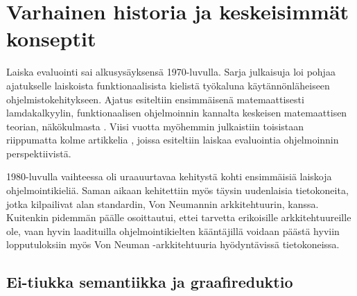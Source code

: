 
\section{Varhainen historia ja keskeisimmät konseptit}\label{historia}

Laiska evaluointi sai alkusysäyksensä 1970-luvulla. Sarja julkaisuja loi pohjaa ajatukselle laiskoista funktionaalisista kielistä työkaluna käytännönläheiseen ohjelmistokehitykseen. Ajatus esiteltiin ensimmäisenä matemaattisesti lamdakalkyylin, funktionaalisen ohjelmoinnin kannalta keskeisen matemaattisen teorian, näkökulmasta \citep{wadsworth1971semantics}. Viisi vuotta myöhemmin julkaistiin toisistaan riippumatta kolme artikkelia \citep{henderson1976lazy,friedman1976cuns,saslmanualturner}, joissa esiteltiin laiskaa evaluointia ohjelmoinnin perspektiivistä.

1980-luvulla vaihteessa oli uraauurtavaa kehitystä kohti ensimmäisiä laiskoja ohjelmointikieliä. Saman aikaan kehitettiin myös täysin uudenlaisia tietokoneita, jotka kilpailivat alan standardin, Von Neumannin arkkitehtuurin, kanssa. Kuitenkin pidemmän päälle osoittautui, ettei tarvetta erikoisille arkkitehtuureille ole, vaan hyvin laadituilla ohjelmointikielten kääntäjillä voidaan päästä hyviin lopputuloksiin myös Von Neuman -arkkitehtuuria hyödyntävissä tietokoneissa. \citep{hudak2007history}

\subsection{Ei-tiukka semantiikka ja graafireduktio}


